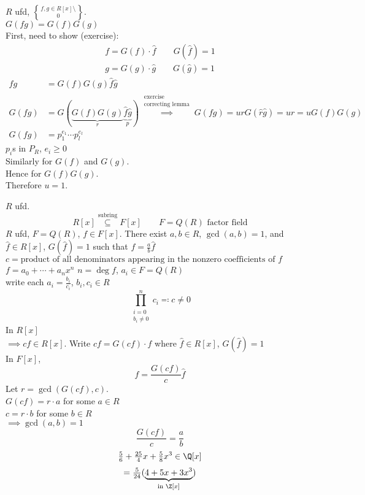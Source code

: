 \thm $R$ ufd, $f,g\in R[x]\setminus\brace0$. \\
$G(fg)=G(f)G(g)$ \\
\pf First, need to show (exercise):
\begin{gather*}
f = G(f)\cdot\hat f \qquad G(\hat f)=1 \\
g = G(g)\cdot\hat g \qquad G(\hat g)=1
\end{gather*}
\begin{align*}
fg &= G(f)G(g)\hat f\hat g \\
G(fg) &= G(\underbrace{G(f)G(g)}_r\underbrace{\hat f\hat g}_p) \overset{\substack{\text{exercise}\\\text{correcting lemma}}}{\implies} G(fg) = ur G(\hat r\hat g) = ur = uG(f)G(g) \\
G(fg) &= p_1^{e_1}\dotsm p_l^{e_l}
\end{align*}
$p_i$s in $P_R$, $e_i\geq0$ \\
Similarly for $G(f)$ and $G(g)$. \\
Hence for $G(f)G(g)$. \\
Therefore $u=1$.

$R$ ufd.
\[ R[x] \overset{\text{subring}}{\subseteq} F[x] \qquad F=Q(R)\text{ factor field} \]
\lem $R$ ufd, $F=Q(R)$, $f\in F[x]$.  There exist $a,b\in R$, $\gcd(a,b)=1$, and $\hat f\in R[x]$, $G(\hat f)=1$ such that $f=\frac{a}{b}\hat f$ \\
\pf $c=\text{product of all denominators appearing in the nonzero coefficients of $f$}$ \\
$f=a_0+\dotsb+a_nx^n$ \qquad $n=\deg f$, $a_i\in F=Q(R)$ \\
write each $a_i=\frac{b_i}{c_i}$, $b_i,c_i\in R$ \\
\[ \prod_{\substack{i=0\\b_i\neq0}}^n c_i \eqqcolon c \neq 0 \]
In $R[x]$ \\
$\implies cf\in R[x]$.  Write $cf=G(cf)\cdot\hat f$ where $\hat f\in R[x]$, $G(\hat f)=1$ \\
In $F[x]$,
\[ f = \frac{G(cf)}{c} \hat f \]
Let $r=\gcd(G(cf),c)$. \\
$G(cf)=r\cdot a$ for some $a\in R$ \\
$c=r\cdot b$ for some $b\in R$ \\
$\implies\gcd(a,b)=1$
\[ \frac{G(cf)}{c} = \frac{a}{b} \]
\ex
\[ \tfrac56+\tfrac{25}4x+\tfrac58x^3 \in \Q[x] \]
\[ = \tfrac5{24}(\underbrace{4+5x+3x^3}_{\text{in $\Z[x]$}}) \]
